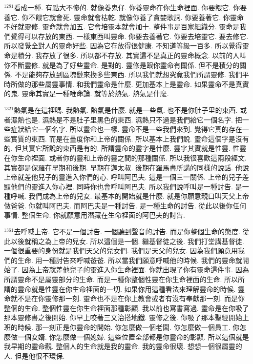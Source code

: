 \documentclass{book}
\begin{document}
$^{1281}$看成一種.
有點大不慘的.
就像養鬼仔.
你養靈命在你生命裡面.
你要餵它.
你要養它.
你不餵它就會死.
靈命就會枯乾.
就像你養了貪婪歌詞.
你要養著它.
你靈命不好就靈修.
靈命就會加五.
它會培靈本就會加十.
整件事是百家組織分.
靈命是我們覺得可以存放的東西.
一樣東西叫靈命.
你要去養著它.
你要去培靈它.
要去修它.
所以發覺全對人的靈命好些.
因為它存放得很健康.
不知道等級一百多.
所以覺得靈命是積分.
我存放了很多.
所以都不存放.
其實這不是真正的靈命概念.
以前的人叫你不斷靈修.
就是為了好些靈命.
是對的.
靈修是跟你靈命有關係.
但不是積分的關係.
不是能夠存放到區塊鏈來換多些東西.
所以我們就想究竟我們所謂靈修.
我們平時所做的那些屬靈事情.
和我們靈命是什麼.
更加基本上是靈命.
如果靈命不是真實的鬼.
靈命其實是一種唯命論.
就等於熱氣.
熱氣是什麼.

$^{1321}$熱氣是在這裡嗎.
我熱氣.
熱氣是什麼.
就是一些氣.
也不是你肚子里的東西.
或者濕熱也是.
濕熱是不是肚子里黑色的東西.
濕熱只不過是我們給它一個名字.
把一些症狀給它一個名字.
所以靈命也一樣.
靈命不是一些我們來到.
覺得它真的存在一些實質的東西.
而是在量度你和上帝的關係.
所以基本上我們說.
靈命這個字是沒有的.
但其實它所說的東西是有的.
所謂靈命的靈字是什麼.
靈字其實就是性靈.
性靈在你生命裡面.
或者你的靈和上帝的靈之間的那種關係.
所以我很喜歡這兩段經文.
其實都是保羅在早期和後期.
早期在迦太叔.
後期在羅馬書所講的同樣的說話.
他說上帝就差他兒子的靈進入你們的心.
呼叫阿巴夫.
這是一個三一關係.
上帝的兒子差顯他們的靈進入你心裡.
同時你也會呼叫阿巴夫.
所以我們說呼叫是一種討告.
是一種呼喊.
我們成為上帝的兒女.
最基本的開始就是什麼.
就是你願意親口叫天父上帝做爸爸.
你就叫阿巴夫.
而阿巴夫是一種討告.
是一種生命的討告.
從此以後你任何事情.
整個生命.
你就願意用潛藏在生命裡面的阿巴夫的討告.

$^{1361}$去呼喊上帝.
它不是一個討告.
一個聽到聲音的討告.
而是你整個生命的態度.
從此以後就稱之為上帝的兒女.
所以這個是一個.
繼基督徒之後.
我們打堂講基督徒.
一個很重要的身份就是我們天父的兒女們.
我們是天父的兒女.
因為我們願意用我們的生命.
用一種討告來呼喊爸爸.
所以當我們願意呼喊他的時候.
我們的靈命就開始了.
因為上帝就差他兒子的靈進入你生命裡面.
你就出現了你有靈命這件事.
因為所謂靈命不是屬靈部分的生命.
而是一種你整個性靈在你生命裡面的生命.
所以所謂的靈命就是性靈在你生命裡面的一切.
如果你用這種看法來理解靈命的時候.
靈命就不是在你靈修那一刻.
靈命也不是在你上教會或者有沒有奉獻那一刻.
而是你整個的生命.
整個性靈在你生命裡面那種彰顯.
我以前也寫書寫過.
靈命是在你吸了那本靈修書之後開始.
你早上咬著三文治搭地鐵.
靈修之後.
你吸了那本聖經開始上班的時候.
那一刻正是你靈命的開始.
你怎麼做一個老闆.
你怎麼做一個員工.
你怎麼做一個女婿.
你怎麼做一個媳婦.
這些位置全部都是你靈命的彰顯.
所以這個就是我早期的靈命觀.
整個人的生命就是我的靈命.
我的靈命很壞.
想想一個很屬靈的人.
但是他很不環保.
\end{document}
